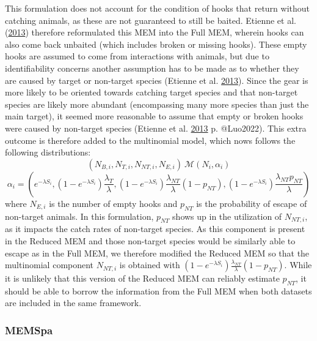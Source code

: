 \documentclass[12pt]{article}\usepackage[]{graphicx}\usepackage[]{color}
\begin{document}
This formulation does not account for the condition of hooks that return without catching animals, as these are not guaranteed to still be baited. Etienne et al. (\protect\hyperlink{ref-Etienne2013}{2013}) therefore reformulated this MEM into the Full MEM, wherein hooks can also come back unbaited (which includes broken or missing hooks). These empty hooks are assumed to come from interactions with animals, but due to identifiability concerns another assumption has to be made as to whether they are caused by target or non-target species (Etienne et al. \protect\hyperlink{ref-Etienne2013}{2013}). Since the gear is more likely to be oriented towards catching target species and that non-target species are likely more abundant (encompassing many more species than just the main target), it seemed more reasonable to assume that empty or broken hooks were caused by non-target species (Etienne et al. \protect\hyperlink{ref-Etienne2013}{2013} p. @Luo2022). This extra outcome is therefore added to the multinomial model, which nows follows the following distributions:
\begin{equation}
(N_{B,i},N_{T,i},N_{NT,i},N_{E,i}) ~ \mathcal{M}(N_i,\alpha_i)
\end{equation} \begin{equation}
\alpha_i = (e^{-\lambda S_i},(1-e^{-\lambda S_i})\frac{\lambda_T}{\lambda},(1-e^{-\lambda S_i})\frac{\lambda_{NT}}{\lambda}(1-p_{NT}),(1-e^{-\lambda S_i})\frac{\lambda_{NT}p_{NT}}{\lambda})
\end{equation}
where \(N_{E,i}\) is the number of empty hooks and \(p_{NT}\) is the probability of escape of non-target animals. In this formulation, \(p_{NT}\) shows up in the utilization of \(N_{NT,i}\), as it impacts the catch rates of non-target species. As this component is present in the Reduced MEM and those non-target species would be similarly able to escape as in the Full MEM, we therefore modified the Reduced MEM so that the multinomial component \(N_{NT,i}\) is obtained with \((1-e^{-\lambda S_i})\frac{\lambda_{NT}}{\lambda}(1-p_{NT})\). While it is unlikely that this version of the Reduced MEM can reliably estimate \(p_{NT}\), it should be able to borrow the information from the Full MEM when both datasets are included in the same framework.

\hypertarget{memspa}{%
\subsubsection{MEMSpa}\label{memspa}}
\end{document}
